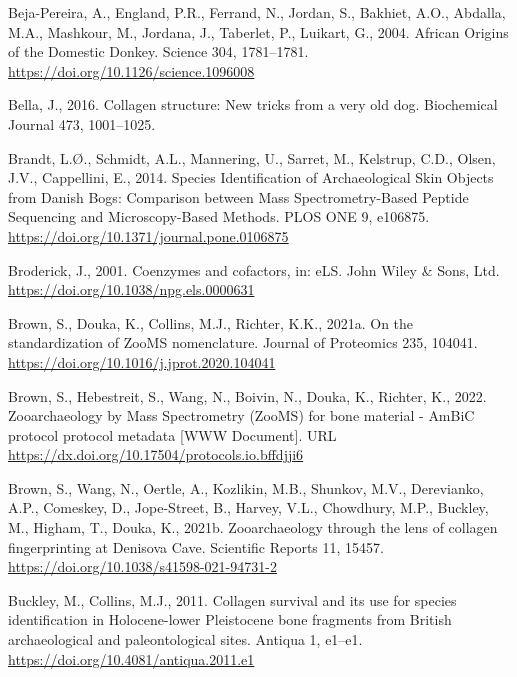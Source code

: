 \documentclass[preprint, 3p, authoryear]{elsarticle} %
\newlength{\cslhangindent}
\newlength{\cslentryspacingunit} %
\newenvironment{CSLReferences}[2] %
 {%
  \setlength{\parindent}{0pt}
  \ifodd #1
  \let\oldpar\par
  \def\par{\hangindent=\cslhangindent\oldpar}
  \fi
  \setlength{\parskip}{#2\cslentryspacingunit}
 }%
 {}
\begin{document}
\begin{CSLReferences}{1}{0}
\leavevmode{}%
Beja-Pereira, A., England, P.R., Ferrand, N., Jordan, S., Bakhiet, A.O., Abdalla, M.A., Mashkour, M., Jordana, J., Taberlet, P., Luikart, G., 2004. African {Origins} of the {Domestic Donkey}. Science 304, 1781--1781. \url{https://doi.org/10.1126/science.1096008}

\leavevmode{}%
Bella, J., 2016. Collagen structure: New tricks from a very old dog. Biochemical Journal 473, 1001--1025.

\leavevmode{}%
Brandt, L.Ø., Schmidt, A.L., Mannering, U., Sarret, M., Kelstrup, C.D., Olsen, J.V., Cappellini, E., 2014. Species {Identification} of {Archaeological Skin Objects} from {Danish Bogs}: {Comparison} between {Mass Spectrometry-Based Peptide Sequencing} and {Microscopy-Based Methods}. PLOS ONE 9, e106875. \url{https://doi.org/10.1371/journal.pone.0106875}

\leavevmode{}%
Broderick, J., 2001. Coenzymes and cofactors, in: {eLS}. {John Wiley \& Sons, Ltd}. \url{https://doi.org/10.1038/npg.els.0000631}

\leavevmode{}%
Brown, S., Douka, K., Collins, M.J., Richter, K.K., 2021a. On the standardization of {ZooMS} nomenclature. Journal of Proteomics 235, 104041. \url{https://doi.org/10.1016/j.jprot.2020.104041}

\leavevmode{}%
Brown, S., Hebestreit, S., Wang, N., Boivin, N., Douka, K., Richter, K., 2022. Zooarchaeology by {Mass Spectrometry} ({ZooMS}) for bone material - {AmBiC} protocol protocol metadata {[}WWW Document{]}. URL \url{https://dx.doi.org/10.17504/protocols.io.bffdjji6}

\leavevmode{}%
Brown, S., Wang, N., Oertle, A., Kozlikin, M.B., Shunkov, M.V., Derevianko, A.P., Comeskey, D., Jope-Street, B., Harvey, V.L., Chowdhury, M.P., Buckley, M., Higham, T., Douka, K., 2021b. Zooarchaeology through the lens of collagen fingerprinting at {Denisova Cave}. Scientific Reports 11, 15457. \url{https://doi.org/10.1038/s41598-021-94731-2}

\leavevmode{}%
Buckley, M., Collins, M.J., 2011. Collagen survival and its use for species identification in {Holocene-lower Pleistocene} bone fragments from {British} archaeological and paleontological sites. Antiqua 1, e1--e1. \url{https://doi.org/10.4081/antiqua.2011.e1}


\end{CSLReferences}
\end{document}
